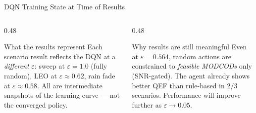 \documentclass[aspectratio=169,10pt]{beamer}
\begin{document}
\begin{frame}[shrink=5]{DQN Training State at Time of Results}
\vspace{0.5em}
\begin{columns}[T]
  \begin{column}{0.48\textwidth}
    \begin{notebox}{What the results represent}
      \small Each scenario result reflects the DQN at a \textit{different} $\varepsilon$:
      sweep at $\varepsilon{=}1.0$ (fully random), LEO at $\varepsilon{\approx}0.62$,
      rain fade at $\varepsilon{\approx}0.58$. All are intermediate snapshots of the
      learning curve — not the converged policy.
    \end{notebox}
  \end{column}
  \begin{column}{0.48\textwidth}
    \begin{resultbox}{Why results are still meaningful}
      \small Even at $\varepsilon=0.564$, random actions are constrained to
      \textit{feasible MODCODs} only (SNR-gated). The agent already shows
      better QEF than rule-based in 2/3 scenarios. Performance will improve
      further as $\varepsilon \to 0.05$.
    \end{resultbox}
  \end{column}
\end{columns}
\end{frame}
\end{document}
